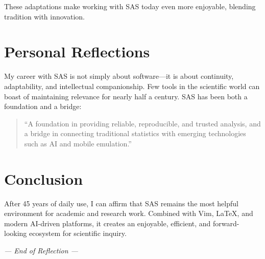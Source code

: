 \documentclass[12pt]{article}
\begin{document}
These adaptations make working with SAS today even more enjoyable, blending tradition with innovation.

\section{Personal Reflections}
My career with SAS is not simply about software---it is about continuity, adaptability, and intellectual companionship. Few tools in the scientific world can boast of maintaining relevance for nearly half a century. SAS has been both a foundation and a bridge:  
\begin{quote}
``A foundation in providing reliable, reproducible, and trusted analysis, and a bridge in connecting traditional statistics with emerging technologies such as AI and mobile emulation.''
\end{quote}

\section*{Conclusion}
After 45 years of daily use, I can affirm that SAS remains the most helpful environment for academic and research work. Combined with Vim, \LaTeX, and modern AI-driven platforms, it creates an enjoyable, efficient, and forward-looking ecosystem for scientific inquiry.  

\vfill
\begin{center}
\textit{--- End of Reflection ---}
\end{center}
\end{document}
